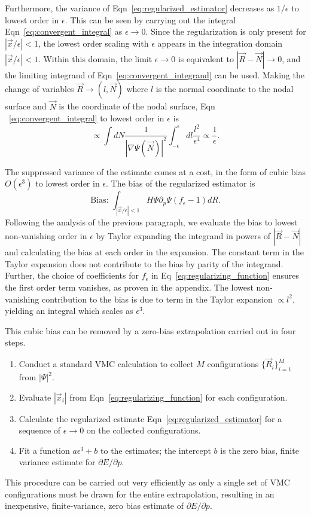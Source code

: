 \documentclass[twocolumn]{revtex4-1}
\begin{document}
Furthermore, the variance of Eqn~\ref{eq:regularized_estimator} decreases as $1/\epsilon$ to lowest order in $\epsilon$.
This can be seen by carrying out the integral Eqn~\ref{eq:convergent_integral} as $\epsilon\rightarrow 0 $. 
Since the regularization is only present for $|\vec{x}/\epsilon| < 1$, the lowest order scaling with $\epsilon$ appears in the integration domain $|\vec{x}/\epsilon| < 1$. 
Within this domain, the limit $\epsilon \rightarrow 0$ is equivalent to $|\vec{R} - \vec{N}| \rightarrow 0$, and the limiting integrand of Eqn~\ref{eq:convergent_integrand} can be used. 
Making the change of variables $\vec{R} \rightarrow (l, \vec{N})$ where $l$ is the normal coordinate to the nodal surface and $\vec{N}$ is the coordinate of the nodal surface, Eqn ~\ref{eq:convergent_integral} to lowest order in $\epsilon$ is 
\begin{equation}
\propto \int dN \frac{1}{|\nabla\Psi(\vec{N})|^2} \int_{-\epsilon}^{\epsilon} dl \frac{l^2}{\epsilon^4} \propto \frac{1}{\epsilon}.
\end{equation}

The suppressed variance of the estimate comes at a cost, in the form of cubic bias $O(\epsilon^3)$ to lowest order in $\epsilon$.
The bias of the regularized estimator is
\begin{equation}
\text{Bias: } \int_{|\vec{x}/\epsilon|< 1} H\Psi \partial_p \Psi (f_\epsilon - 1) dR.
\label{eq:estimator_bias}
\end{equation}
Following the analysis of the previous paragraph, we evaluate the bias to lowest non-vanishing order in $\epsilon$ by Taylor expanding the integrand in powers of $|\vec{R} - \vec{N}|$ and calculating the bias at each order in the expansion.
The constant term in the Taylor expansion does not contribute to the bias by parity of the integrand.
Further, the choice of coefficients for $f_\epsilon$ in Eq~\ref{eq:regularizing_function} ensures the first order term vanishes, as proven in the appendix.
The lowest non-vanishing contribution to the bias is due to term in the Taylor expansion $\propto l^2$, yielding an integral which scales as $\epsilon^3$.

This cubic bias can be removed by a zero-bias extrapolation carried out in four steps.
\begin{enumerate}
\item Conduct a standard VMC calculation to collect $M$ configurations $\{\vec{R}_i\}_{i=1}^M$ from $|\Psi|^2$.
\item Evaluate $|\vec{x}_i|$ from Eqn~\ref{eq:regularizing_function} for each configuration.
\item Calculate the regularized estimate Eqn~\ref{eq:regularized_estimator} for a sequence of $\epsilon \rightarrow 0$ on the collected configurations.
\item Fit a function $a\epsilon^3 + b$ to the estimates; the intercept $b$ is the zero bias, finite variance estimate for $\partial E/\partial p$.
\end{enumerate}
This procedure can be carried out very efficiently as only a single set of VMC configurations must be drawn for the entire extrapolation, resulting in an inexpensive, finite-variance, zero bias estimate of $\partial E/\partial p$.
\end{document}
